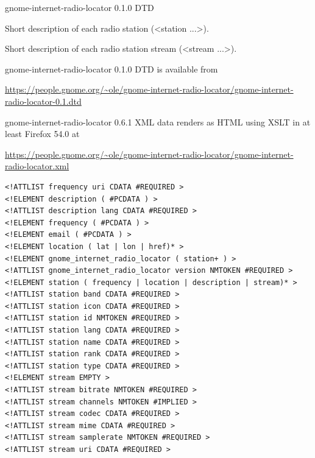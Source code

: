\documentclass[20pt,landscape]{foils}
\begin{document}
\begin{list1}
\item gnome-internet-radio-locator 0.1.0 DTD
\item Short description of each radio station (<station ...>).
\item Short description of each radio station stream (<stream ...>).
\item gnome-internet-radio-locator 0.1.0 DTD is available from \begin{tiny}\url{https://people.gnome.org/~ole/gnome-internet-radio-locator/gnome-internet-radio-locator-0.1.dtd}\end{tiny}
\item gnome-internet-radio-locator 0.6.1 XML data renders as HTML using XSLT in at least Firefox 54.0 at \begin{tiny}\url{https://people.gnome.org/~ole/gnome-internet-radio-locator/gnome-internet-radio-locator.xml}\end{tiny}
\end{list1}



\begin{tiny}
\begin{verbatim}
<!ATTLIST frequency uri CDATA #REQUIRED >
<!ELEMENT description ( #PCDATA ) >
<!ATTLIST description lang CDATA #REQUIRED >
<!ELEMENT frequency ( #PCDATA ) >
<!ELEMENT email ( #PCDATA ) >
<!ELEMENT location ( lat | lon | href)* >
<!ELEMENT gnome_internet_radio_locator ( station+ ) >
<!ATTLIST gnome_internet_radio_locator version NMTOKEN #REQUIRED >
<!ELEMENT station ( frequency | location | description | stream)* >
<!ATTLIST station band CDATA #REQUIRED >
<!ATTLIST station icon CDATA #REQUIRED >
<!ATTLIST station id NMTOKEN #REQUIRED >
<!ATTLIST station lang CDATA #REQUIRED >
<!ATTLIST station name CDATA #REQUIRED >
<!ATTLIST station rank CDATA #REQUIRED >
<!ATTLIST station type CDATA #REQUIRED >
<!ELEMENT stream EMPTY >
<!ATTLIST stream bitrate NMTOKEN #REQUIRED >
<!ATTLIST stream channels NMTOKEN #IMPLIED >
<!ATTLIST stream codec CDATA #REQUIRED >
<!ATTLIST stream mime CDATA #REQUIRED >
<!ATTLIST stream samplerate NMTOKEN #REQUIRED >
<!ATTLIST stream uri CDATA #REQUIRED >
\end{verbatim}
\end{tiny}

\end{document}
